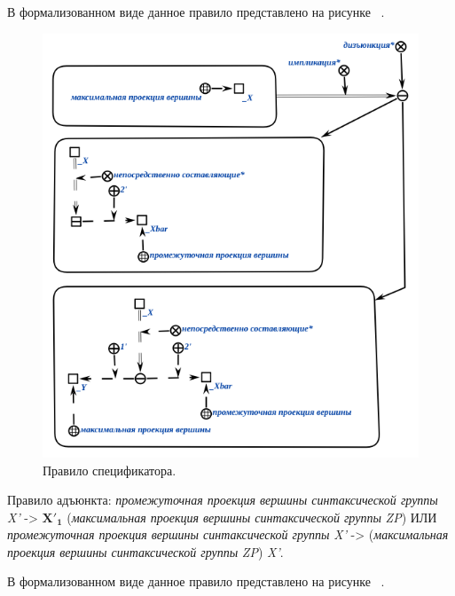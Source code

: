 В формализованном виде данное правило представлено на рисунке ~\textit{}.

\begin{figure}[h]
    \centering
    \includegraphics[scale=0.8]{images/part2/chapter_lang/specifier_rule}
    \caption{Правило спецификатора.}
    \label{fig:specifier_rule}
\end{figure}

Правило адъюнкта: \textit{промежуточная проекция вершины синтаксической группы} \textit{X'} -> \textit{$\bm{X'_1}$} (\textit{максимальная проекция вершины синтаксической группы} \textit{ZP}) ИЛИ \textit{промежуточная проекция вершины синтаксической группы} \textit{X'} -> (\textit{максимальная проекция вершины синтаксической группы} \textit{ZP}) \textit{X'}.


В формализованном виде данное правило представлено на рисунке ~\textit{}.

